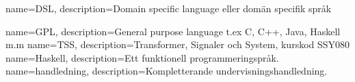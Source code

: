 {
    name=DSL,
    description={Domain specific language eller domän specifik språk}
}

{
    name=GPL,
    description={General purpose language t.ex C, C++, Java, Haskell m.m}
}
{
    name=TSS,
    description={Transformer, Signaler och System, kurskod SSY080}
}
{
	name=Haskell,
	description={Ett funktionell programmeringspråk.}
}
{
	name=handledning,
	description={Kompletterande undervisningshandledning.}
}

